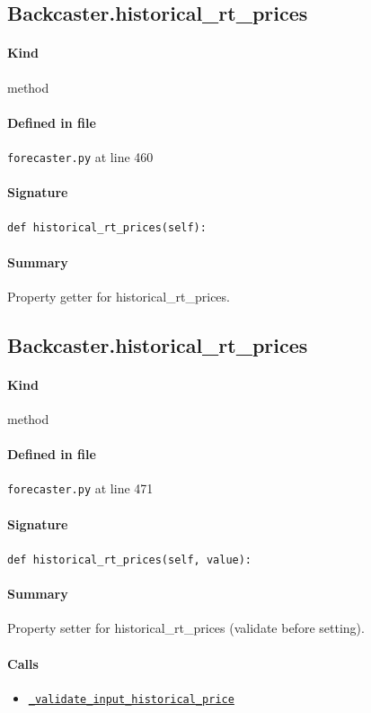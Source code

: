 \documentclass[11pt]{report}
\begin{document}
\subsection{Backcaster.historical\_rt\_prices}
\label{def:forecaster.py:Backcaster.historical_rt_prices:L460}
\paragraph{Kind} method
\paragraph{Defined in file} \texttt{forecaster.py} at line 460
\paragraph{Signature} \texttt{def historical\_rt\_prices(self):}
\paragraph{Summary} Property getter for historical\_rt\_prices.
\subsection{Backcaster.historical\_rt\_prices}
\label{def:forecaster.py:Backcaster.historical_rt_prices:L471}
\paragraph{Kind} method
\paragraph{Defined in file} \texttt{forecaster.py} at line 471
\paragraph{Signature} \texttt{def historical\_rt\_prices(self, value):}
\paragraph{Summary} Property setter for historical\_rt\_prices (validate before setting).
\paragraph{Calls}
\begin{itemize}[leftmargin=*]
  \item \hyperref[def:forecaster.py:Backcaster._validate_input_historical_price:L348]{\texttt{\_validate\_input\_historical\_price}}
\end{itemize}
\end{document}
